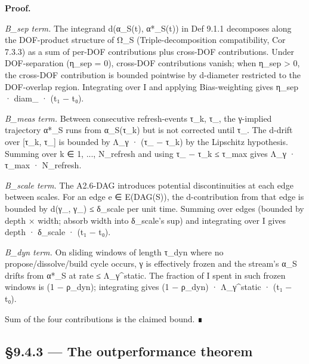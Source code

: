 \documentclass[11pt, openany]{book}
\begin{document}
\textbf{Proof.}

\textit{B\_\allowbreak{}sep term.} The integrand d(α\_\allowbreak{}S(t), α*\_\allowbreak{}S(t)) in Def 9.1.1 decomposes along the DOF-product structure of Ω\_\allowbreak{}S (Triple-decomposition compatibility, Cor 7.3.3) as a sum of per-DOF contributions plus cross-DOF contributions. Under DOF-separation (η\_\allowbreak{}sep = 0), cross-DOF contributions vanish; when η\_\allowbreak{}sep > 0, the cross-DOF contribution is bounded pointwise by d-diameter restricted to the DOF-overlap region. Integrating over I and applying Bias-weighting gives η\_\allowbreak{}sep · diam\_ · (t₁ − t₀).

\textit{B\_\allowbreak{}meas term.} Between consecutive refresh-events τ\_\allowbreak{}k, τ\_, the γ-implied trajectory α*\_\allowbreak{}S runs from α\_\allowbreak{}S(τ\_\allowbreak{}k) but is not corrected until τ\_. The d-drift over [τ\_\allowbreak{}k, τ\_] is bounded by Λ\_\allowbreak{}γ · (τ\_ − τ\_\allowbreak{}k) by the Lipschitz hypothesis. Summing over k ∈ {1, ..., N\_\allowbreak{}refresh} and using τ\_ − τ\_\allowbreak{}k ≤ τ\_\allowbreak{}max gives Λ\_\allowbreak{}γ · τ\_\allowbreak{}max · N\_\allowbreak{}refresh.

\textit{B\_\allowbreak{}scale term.} The A2.6-DAG introduces potential discontinuities at each edge between scales. For an edge e ∈ E(DAG(S)), the d-contribution from that edge is bounded by d(γ\_, γ\_) ≤ δ\_\allowbreak{}scale per unit time. Summing over edges (bounded by depth × width; absorb width into δ\_\allowbreak{}scale's sup) and integrating over I gives depth · δ\_\allowbreak{}scale · (t₁ − t₀).

\textit{B\_\allowbreak{}dyn term.} On sliding windows of length τ\_\allowbreak{}dyn where no propose/dissolve/build cycle occurs, γ is effectively frozen and the stream's α\_\allowbreak{}S drifts from α*\_\allowbreak{}S at rate ≤ Λ\_\allowbreak{}γ\textasciicircum{}static. The fraction of I spent in such frozen windows is (1 − ρ\_\allowbreak{}dyn); integrating gives (1 − ρ\_\allowbreak{}dyn) · Λ\_\allowbreak{}γ\textasciicircum{}static · (t₁ − t₀).

Sum of the four contributions is the claimed bound. ∎

\subsection{§9.4.3 --- The outperformance theorem}
\end{document}
